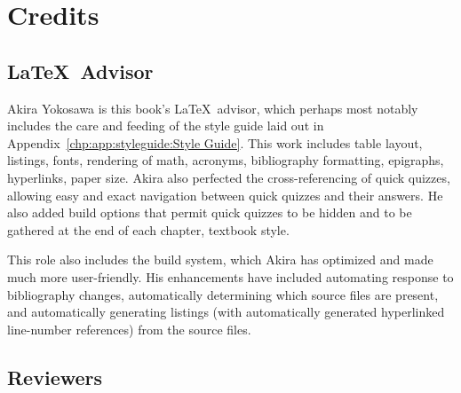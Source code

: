 
\chapter{Credits}
\label{bck:ack:Credits}
%



\section{\LaTeX\ Advisor}

Akira Yokosawa is this book's \LaTeX\ advisor, which perhaps most
notably includes the care and feeding of the style guide laid out
in Appendix~\ref{chp:app:styleguide:Style Guide}.
This work includes table layout, listings, fonts, rendering of math,
acronyms, bibliography formatting, epigraphs, hyperlinks, paper size.
Akira also perfected the cross-referencing of quick quizzes, allowing
easy and exact navigation between quick quizzes and their answers.
He also added build options that permit quick quizzes to be hidden
and to be gathered at the end of each chapter, textbook style.

This role also includes the build system, which Akira has optimized and
made much more user-friendly.
His enhancements have included automating response to bibliography
changes, automatically determining which source files are present,
and automatically generating listings (with automatically generated
hyperlinked line-number references) from the source files.

\section{Reviewers}

